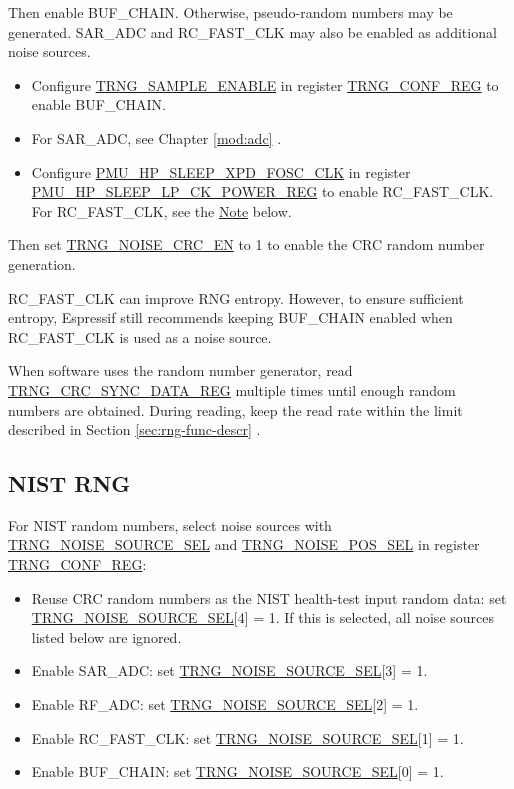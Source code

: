 \documentclass[main\_\_EN.tex]{subfiles}
\begin{document}
Then enable BUF\_CHAIN. Otherwise, pseudo-random numbers may be generated. SAR\_ADC and RC\_FAST\_CLK may also be enabled as additional noise sources.
\begin{itemize}
    \item Configure \hyperref[fielddesc:TRNGSAMPLEENABLE]{TRNG\_SAMPLE\_ENABLE} in register \hyperref[regdesc:TRNGCONFREG]{TRNG\_CONF\_REG} to enable BUF\_CHAIN.
    \item For SAR\_ADC, see Chapter \ref{mod:adc} \textit{}.
    \item Configure \hyperref[fielddesc:PMUHPSLEEPXPDFOSCCLK]{PMU\_HP\_SLEEP\_XPD\_FOSC\_CLK} in register \hyperref[regdesc:PMUHPSLEEPLPCKPOWERREG]{PMU\_HP\_SLEEP\_LP\_CK\_POWER\_REG} to enable RC\_FAST\_CLK. For RC\_FAST\_CLK, see the \hyperref[others:rng-note-clock-seed]{Note} below.
\end{itemize}

Then set \hyperref[fielddesc:TRNGNOISECRCEN]{TRNG\_NOISE\_CRC\_EN} to 1 to enable the CRC random number generation.

\begin{tiplisting}\label{others:rng-note-clock-seed}
    RC\_FAST\_CLK can improve RNG entropy. However, to ensure sufficient entropy, Espressif still recommends keeping BUF\_CHAIN enabled when RC\_FAST\_CLK is used as a noise source.
\end{tiplisting}

When software uses the random number generator, read \hyperref[regdesc:TRNGCRCSYNCDATAREG]{TRNG\_CRC\_SYNC\_DATA\_REG} multiple times until enough random numbers are obtained. During reading, keep the read rate within the limit described in Section \ref{sec:rng-func-descr} \textit{}.

\subsection{NIST RNG}\label{sec:rng-nist-rng}

For NIST random numbers, select noise sources with \hyperref[fielddesc:TRNGNOISESOURCESEL]{TRNG\_NOISE\_SOURCE\_SEL} and \hyperref[fielddesc:TRNGNOISEPOSSEL]{TRNG\_NOISE\_POS\_SEL} in register \hyperref[regdesc:TRNGCONFREG]{TRNG\_CONF\_REG}:
\begin{itemize}
    \item Reuse CRC random numbers as the NIST health-test input random data: set \hyperref[fielddesc:TRNGNOISESOURCESEL]{TRNG\_NOISE\_SOURCE\_SEL}[4] = 1. If this is selected, all noise sources listed below are ignored.
    \item Enable SAR\_ADC: set \hyperref[fielddesc:TRNGNOISESOURCESEL]{TRNG\_NOISE\_SOURCE\_SEL}[3] = 1.
    \item Enable RF\_ADC: set \hyperref[fielddesc:TRNGNOISESOURCESEL]{TRNG\_NOISE\_SOURCE\_SEL}[2] = 1.
    \item Enable RC\_FAST\_CLK: set \hyperref[fielddesc:TRNGNOISESOURCESEL]{TRNG\_NOISE\_SOURCE\_SEL}[1] = 1.
    \item Enable BUF\_CHAIN: set \hyperref[fielddesc:TRNGNOISESOURCESEL]{TRNG\_NOISE\_SOURCE\_SEL}[0] = 1.
\end{itemize}
\end{document}
